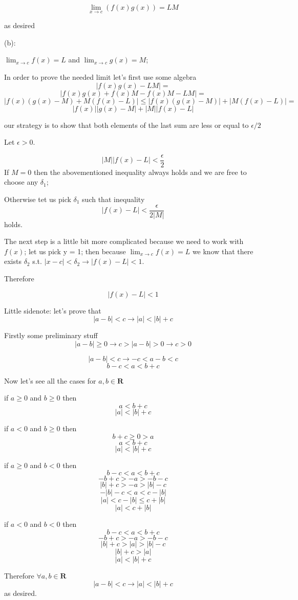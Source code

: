 \documentclass[11pt,oneside,titlepage]{article}
\begin{document}
$$\lim_{x \to c}(f(x)g(x)) = L M $$

as desired

(b):

$\lim_{x \to c} f(x) = L$ and $\lim_{x \to c} g(x) = M$;

In  order to prove the needed limit let's first use some algebra
$$ |f(x)g(x) - LM| = $$
$$ |f(x)g(x) + f(x)M - f(x)M - LM| = $$
$$|f(x)(g(x) - M) + M(f(x) - L)| \leq
|f(x)(g(x) - M)| + | M(f(x) - L)| = $$
$$|f(x)||g(x) - M| + |M||f(x) - L|  $$

our strategy is to show that both elements of the last sum are less or equal to $\epsilon/2$

Let $\epsilon > 0$.

$$ |M||f(x) - L| < \frac{\epsilon}{2}$$
If $M = 0$ then the abovementioned inequality always holds and we are free to choose any $\delta_1$;

Otherwise tet us pick $\delta_1$ such that inequality
$$ |f(x) - L| < \frac{\epsilon}{2|M|}$$
holds.

The next step is a little bit more complicated because we need to work with $f(x)$; let us pick y = 1;
then because $\lim_{x \to c}f(x) = L$ we know that there exists $\delta_2$ s.t. $|x - c| < \delta_2
\to |f(x) - L| < 1$. 

Therefore

$$|f(x) - L| < 1$$

Little sidenote: let's prove that 
$$ |a - b| < c \to |a| < |b| + c  $$

Firstly some preliminary stuff
$$|a - b| \geq 0 \to c > |a - b| > 0 \to c > 0$$

$$|a - b| < c \to -c < a - b < c$$
$$b -c < a  < b + c$$

Now let's see all the cases for $a, b \in \textbf{R}$

if $a \geq 0$ and $b \geq 0$ then
$$a < b + c$$
$$|a| < |b| + c$$

if $a < 0$ and $b \geq 0$ then
$$ b + c \geq 0 > a$$
$$a < b + c$$
$$|a| < |b| + c$$

if $a \geq 0$ and $b < 0$ then
$$b -c < a  < b + c$$
$$-b +c > -a  > -b - c$$
$$|b| +c > -a  > |b| - c$$
$$-|b| - c  < a  <  c - |b|$$
$$|a|  <  c - |b| \leq c + |b|$$
$$|a|  <  c + |b|$$

if $a < 0$ and $b < 0$ then
$$b -c < a  < b + c$$
$$-b + c > -a  > -b - c$$
$$|b| + c > |a|  > |b| - c$$
$$|b| + c > |a|$$
$$|a| < |b| + c$$

Therefore $\forall a,b\in \textbf{R}$
$$|a - b| < c \to |a| < |b| + c$$
as desired.
\end{document}
